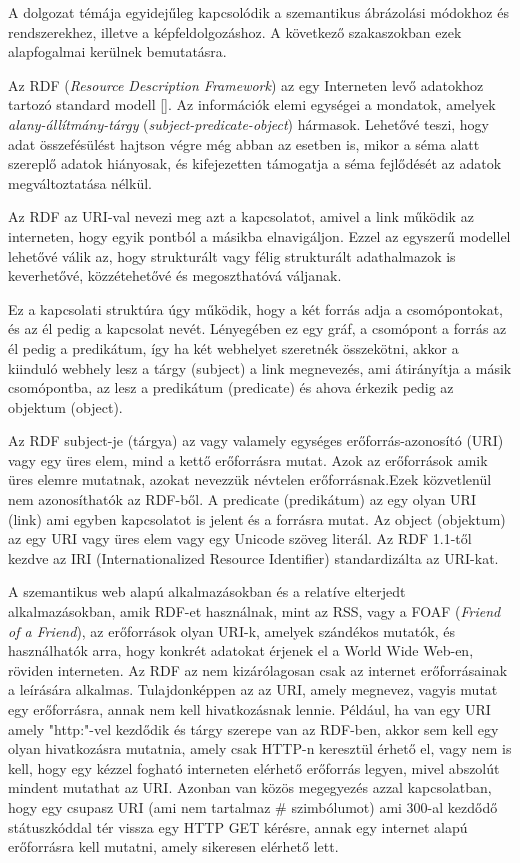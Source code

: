 
A dolgozat témája egyidejűleg kapcsolódik a szemantikus ábrázolási módokhoz és rendszerekhez, illetve a képfeldolgozáshoz. A következő szakaszokban ezek alapfogalmai kerülnek bemutatásra.



Az RDF (\textit{Resource Description Framework}) az egy Interneten levő adatokhoz tartozó standard modell []. Az információk elemi egységei a mondatok, amelyek \textit{alany-állítmány-tárgy} (\textit{subject-predicate-object}) hármasok. Lehetővé teszi, hogy adat összefésülést hajtson végre még abban az esetben is, mikor a séma alatt szereplő adatok hiányosak, és kifejezetten támogatja a séma fejlődését az adatok megváltoztatása nélkül.

Az RDF az URI-val nevezi meg azt a kapcsolatot, amivel a link működik az interneten, hogy egyik pontból a másikba elnavigáljon. Ezzel az egyszerű modellel lehetővé válik az, hogy strukturált vagy félig strukturált adathalmazok is keverhetővé, közzétehetővé és megoszthatóvá váljanak.

Ez a kapcsolati struktúra úgy működik, hogy a két forrás adja a csomópontokat, és az él pedig a kapcsolat nevét. Lényegében ez egy gráf, a csomópont a forrás az él pedig a predikátum, így ha két webhelyet szeretnék összekötni, akkor a kiinduló webhely lesz a tárgy (subject) a link megnevezés, ami átirányítja a másik csomópontba, az lesz a predikátum (predicate) és ahova érkezik pedig az objektum (object).

Az RDF subject-je (tárgya) az vagy valamely egységes erőforrás-azonosító (URI) vagy egy üres elem, mind a kettő erőforrásra mutat. Azok az erőforrások amik üres elemre mutatnak, azokat nevezzük névtelen erőforrásnak.Ezek közvetlenül nem azonosíthatók az RDF-ből. A predicate (predikátum) az egy olyan URI (link) ami egyben kapcsolatot is jelent és a forrásra mutat. Az object (objektum) az egy URI vagy üres elem vagy egy Unicode szöveg literál. Az RDF 1.1-től kezdve az IRI (Internationalized Resource Identifier) standardizálta az URI-kat.

A szemantikus web alapú alkalmazásokban és a relatíve elterjedt alkalmazásokban, amik RDF-et használnak, mint az RSS, vagy a FOAF (\textit{Friend of a Friend}), az erőforrások olyan URI-k, amelyek szándékos mutatók, és használhatók arra, hogy konkrét adatokat érjenek el a World Wide Web-en, röviden interneten. Az RDF az nem kizárólagosan csak az internet erőforrásainak a leírására alkalmas. Tulajdonképpen az az URI, amely megnevez, vagyis mutat egy erőforrásra, annak nem kell hivatkozásnak lennie. Például, ha van egy URI amely "http:"-vel kezdődik és tárgy szerepe van az RDF-ben, akkor sem kell egy olyan hivatkozásra mutatnia, amely csak HTTP-n keresztül érhető el, vagy nem is kell, hogy egy kézzel fogható interneten elérhető erőforrás legyen, mivel abszolút mindent mutathat az URI. Azonban van közös megegyezés azzal kapcsolatban, hogy egy csupasz URI (ami nem tartalmaz \# szimbólumot) ami 300-al kezdődő státuszkóddal tér vissza egy HTTP GET kérésre, annak egy internet alapú erőforrásra kell mutatni, amely sikeresen elérhető lett.

